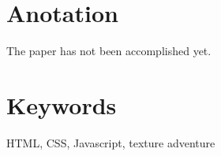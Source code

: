 \documentclass[main.tex]{subfiles}
\begin{document}
\section*{Anotation}
The paper has not been accomplished yet.

\section*{Keywords}
HTML, CSS, Javascript, texture adventure 
\end{document}
